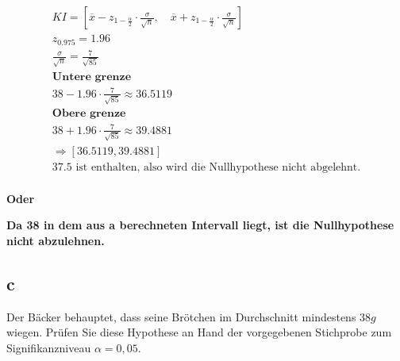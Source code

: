 \begin{align*}
    KI = \left[\overline{x} - z_{1 - \frac{\alpha}{2}} \cdot \frac{\sigma}{\sqrt{n}}, \quad \overline{x} + z_{1 - \frac{\alpha}{2}} \cdot \frac{\sigma}{\sqrt{n}}\right] \\
    z_{0.975} = 1.96                                                                                                                                                     \\
    \frac{\sigma}{\sqrt{n}} = \frac{7}{\sqrt{85}}                                                                                                                        \\
    \textbf{Untere grenze}                                                                                                                                               \\
    38 - 1.96 \cdot \frac{7}{\sqrt{85}} \approx 36.5119                                                                                                                  \\
    \textbf{Obere grenze}                                                                                                                                                \\
    38 + 1.96 \cdot \frac{7}{\sqrt{85}} \approx 39.4881                                                                                                                  \\
    \Rightarrow [36.5119, 39.4881]                                                                                                                                       \\
    \text{37.5 ist enthalten, also wird die Nullhypothese nicht abgelehnt.}                                                                                              \\
\end{align*}

\textbf{Oder}

\textbf{Da 38 in dem aus a berechneten Intervall liegt, ist die Nullhypothese nicht abzulehnen.}

\subsection{c}

Der Bäcker behauptet, dass seine Brötchen im Durchschnitt mindestens $38g$
wiegen. Prüfen Sie diese Hypothese an Hand der vorgegebenen Stichprobe zum
Signifikanzniveau $\alpha = 0,05$.

